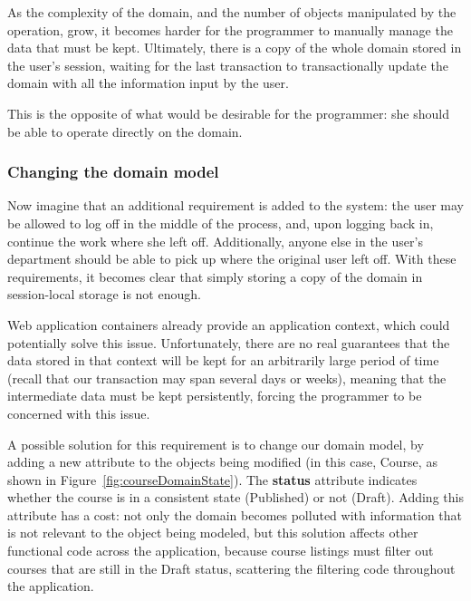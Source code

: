 \documentclass{llncs}
\begin{document}
As the complexity of the domain, and the number of objects manipulated
by the operation, grow, it becomes harder for the programmer to
manually manage the data that must be kept. Ultimately, there is a
copy of the whole domain stored in the user's session, waiting for the
last transaction to transactionally update the domain with all the
information input by the user.

This is the opposite of what would be desirable for the programmer:
she should be able to operate directly on the domain.

\subsubsection{Changing the domain model}

Now imagine that an additional requirement is added to the system: the
user may be allowed to log off in the middle of the process, and, upon
logging back in, continue the work where she left off. Additionally,
anyone else in the user's department should be able to pick up where
the original user left off. With these requirements, it becomes clear
that simply storing a copy of the domain in session-local storage is
not enough.

Web application containers already provide an application context,
which could potentially solve this issue. Unfortunately, there are no
real guarantees that the data stored in that context will be kept for
an arbitrarily large period of time (recall that our transaction may
span several days or weeks), meaning that the intermediate data must
be kept persistently, forcing the programmer to be concerned with this
issue.

A possible solution for this requirement is to change our domain
model, by adding a new attribute to the objects being modified (in
this case, Course, as shown in
Figure~\ref{fig:courseDomainState}). The {\bf status} attribute
indicates whether the course is in a consistent state (Published) or
not (Draft). Adding this attribute has a cost: not only the domain
becomes polluted with information that is not relevant to the object
being modeled, but this solution affects other functional code across
the application, because course listings must filter out courses that
are still in the Draft status, scattering the filtering code
throughout the application.
\end{document}
